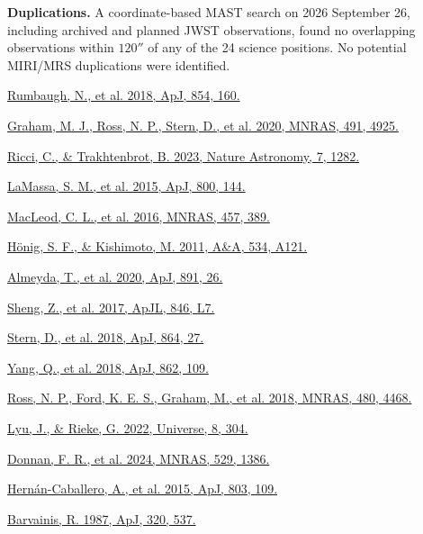 \documentclass[12pt]{article}
\begin{document}
\noindent\textbf{Duplications.} A coordinate-based MAST search on 2026 September 26, including archived and planned JWST observations, found no overlapping observations within $120''$ of any of the 24 science positions. No potential MIRI/MRS duplications were identified.

\noindent [1] \href{https://doi.org/10.3847/1538-4357/aaa9b6}{Rumbaugh, N., et al. 2018, ApJ, 854, 160.}\par
\noindent [2] \href{https://doi.org/10.1093/mnras/stz3244}{Graham, M. J., Ross, N. P., Stern, D., et al. 2020, MNRAS, 491, 4925.}\par
\noindent [3] \href{https://www.nature.com/articles/s41550-023-02108-4}{Ricci, C., \& Trakhtenbrot, B. 2023, Nature Astronomy, 7, 1282.}\par
\noindent [4] \href{https://doi.org/10.1088/0004-637X/800/2/144}{LaMassa, S. M., et al. 2015, ApJ, 800, 144.}\par
\noindent [5] \href{https://doi.org/10.1093/mnras/stv2997}{MacLeod, C. L., et al. 2016, MNRAS, 457, 389.}\par
\noindent [6] \href{https://doi.org/10.1051/0004-6361/201117750}{H\"onig, S. F., \& Kishimoto, M. 2011, A\&A, 534, A121.}\par
\noindent [7] \href{https://doi.org/10.3847/1538-4357/ab6aa1}{Almeyda, T., et al. 2020, ApJ, 891, 26.}\par
\noindent [8] \href{https://authors.library.caltech.edu/records/qjtjh-0cw44}{Sheng, Z., et al. 2017, ApJL, 846, L7.}\par
\noindent [9] \href{https://authors.library.caltech.edu/records/azy2b-r2w44}{Stern, D., et al. 2018, ApJ, 864, 27.}\par
\noindent [10] \href{https://arxiv.org/abs/1711.08122}{Yang, Q., et al. 2018, ApJ, 862, 109.}\par
\noindent [11] \href{https://doi.org/10.1093/mnras/sty2002}{Ross, N. P., Ford, K. E. S., Graham, M., et al. 2018, MNRAS, 480, 4468.}\par
\noindent [12] \href{https://doi.org/10.3390/universe8060304}{Lyu, J., \& Rieke, G. 2022, Universe, 8, 304.}\par
\noindent [13] \href{https://doi.org/10.1093/mnras/stae612}{Donnan, F. R., et al. 2024, MNRAS, 529, 1386.}\par
\noindent [14] \href{https://doi.org/10.1088/0004-637X/803/2/109}{Hern\'an-Caballero, A., et al. 2015, ApJ, 803, 109.}\par
\noindent [15] \href{https://articles.adsabs.harvard.edu/pdf/1987ApJ...320..537B}{Barvainis, R. 1987, ApJ, 320, 537.}\par
\end{document}
